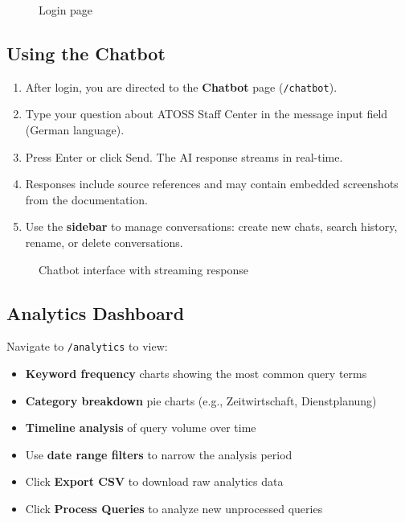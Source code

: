 \documentclass[a4paper,12pt]{report}
\begin{document}
\begin{figure}[H]
\centering
{}
\caption{Login page}
\label{fig:login}
\end{figure}

\subsection{Using the Chatbot}
\begin{enumerate}
    \item After login, you are directed to the \textbf{Chatbot} page (\texttt{/chatbot}).
    \item Type your question about ATOSS Staff Center in the message input field (German language).
    \item Press Enter or click Send. The AI response streams in real-time.
    \item Responses include source references and may contain embedded screenshots from the documentation.
    \item Use the \textbf{sidebar} to manage conversations: create new chats, search history, rename, or delete conversations.
\end{enumerate}

\begin{figure}[H]
\centering
{}
\caption{Chatbot interface with streaming response}
\label{fig:chatbot}
\end{figure}

\subsection{Analytics Dashboard}
Navigate to \texttt{/analytics} to view:
\begin{itemize}
    \item \textbf{Keyword frequency} charts showing the most common query terms
    \item \textbf{Category breakdown} pie charts (e.g., Zeitwirtschaft, Dienstplanung)
    \item \textbf{Timeline analysis} of query volume over time
    \item Use \textbf{date range filters} to narrow the analysis period
    \item Click \textbf{Export CSV} to download raw analytics data
    \item Click \textbf{Process Queries} to analyze new unprocessed queries
\end{itemize}
\end{document}
